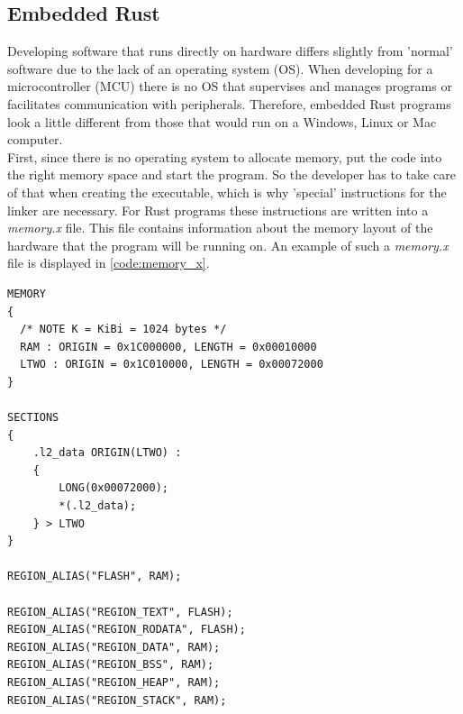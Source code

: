 \subsection{Embedded Rust}

Developing software that runs directly on hardware differs slightly from 'normal' software due to the lack of an operating system (OS).
When developing for a microcontroller (MCU) there is no OS that supervises and manages programs or facilitates communication with peripherals.
Therefore, embedded Rust programs look a little different from those that would run on a Windows, Linux or Mac computer.
\\
First, since there is no operating system to allocate memory, put the code into the right memory space and start the program.
So the developer has to take care of that when creating the executable, which is why 'special' instructions for the linker are necessary.
For Rust programs these instructions are written into a \emph{memory.x} file.
This file contains information about the memory layout of the hardware that the program will be running on.
An example of such a \emph{memory.x} file is displayed in \ref{code:memory_x}.

\newpage
\begin{lstlisting}[style=colorEX,caption={Example memory.x file},label={code:memory_x}]
MEMORY
{
  /* NOTE K = KiBi = 1024 bytes */
  RAM : ORIGIN = 0x1C000000, LENGTH = 0x00010000
  LTWO : ORIGIN = 0x1C010000, LENGTH = 0x00072000
}

SECTIONS
{
    .l2_data ORIGIN(LTWO) :
    {
        LONG(0x00072000);
        *(.l2_data);
    } > LTWO
}

REGION_ALIAS("FLASH", RAM);

REGION_ALIAS("REGION_TEXT", FLASH);
REGION_ALIAS("REGION_RODATA", FLASH);
REGION_ALIAS("REGION_DATA", RAM);
REGION_ALIAS("REGION_BSS", RAM);
REGION_ALIAS("REGION_HEAP", RAM);
REGION_ALIAS("REGION_STACK", RAM);

\end{lstlisting}


